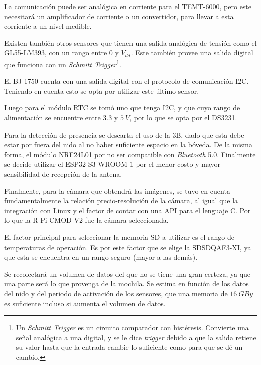 La comunicación puede ser analógica en corriente para el TEMT-6000, pero este necesitará un amplificador de corriente o un convertidor, para llevar a esta corriente a un nivel medible.

Existen también otros sensores que tienen una salida analógica de tensión como el GL55-LM393, con un rango entre 0 y $V_{dd}$. Este también provee una salida digital que funciona con un \textit{Schmitt Trigger}\footnote{Un \textit{Schmitt Trigger} es un circuito comparador con histéresis. Convierte una señal analógica a una digital, y se le dice \textit{trigger} debido a que la salida retiene su valor hasta que la entrada cambie lo suficiente como para que se dé un cambio.}.

El BJ-1750 cuenta con una salida digital con el protocolo de comunicación I2C. Teniendo en cuenta esto se opta por utilizar este último sensor. 

Luego para el módulo RTC se tomó uno que tenga I2C, y que cuyo rango de alimentación se encuentre entre $3.3$ y $5 \ V$, por lo que se opta por el DS3231.

Para la detección de presencia se descarta el uso de la \rpi 3B, dado que esta debe estar por fuera del nido al no haber suficiente espacio en la bóveda. De la misma forma, el módulo NRF24L01 por no ser compatible con \textit{Bluetooth} 5.0. Finalmente se decide utilizar el ESP32-S3-WROOM-1 por el menor costo y mayor sensibilidad de recepción de la antena.

Finalmente, para la cámara que obtendrá las imágenes, se tuvo en cuenta fundamentalmente la relación precio-resolución de la cámara, al igual que la integración con Linux y el factor de contar con una API para el lenguaje C. Por lo que la R-Pi-CMOD-V2 fue la cámara seleccionada.


El factor principal para seleccionar la memoria SD a utilizar es el rango de temperaturas de operación. Es por este factor que se elige la SDSDQAF3-XI, ya que esta se encuentra en un rango seguro (mayor a las demás).

Se recolectará un volumen de datos del que no se tiene una gran certeza, ya que una parte será lo que provenga de la mochila. Se estima en función de los datos del nido y del periodo de activación de los sensores, que una memoria de $16 \ GBy$ es suficiente incluso si aumenta el volumen de datos.


